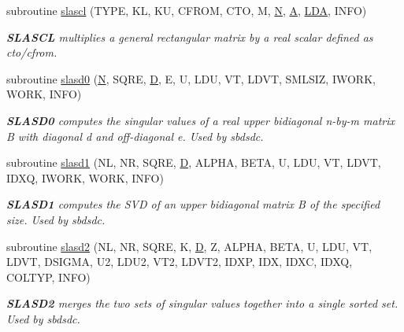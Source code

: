 \begin{DoxyCompactItemize}
subroutine \hyperlink{group__auxOTHERauxiliary_ga11e6ce67ce97ca5b0a3a7bc5645a09d9}{slascl} (T\+Y\+P\+E, K\+L, K\+U, C\+F\+R\+O\+M, C\+T\+O, M, \hyperlink{polmisc_8c_a0240ac851181b84ac374872dc5434ee4}{N}, \hyperlink{classA}{A}, \hyperlink{example__user_8c_ae946da542ce0db94dced19b2ecefd1aa}{L\+D\+A}, I\+N\+F\+O)
\begin{DoxyCompactList}\small\item\em {\bfseries S\+L\+A\+S\+C\+L} multiplies a general rectangular matrix by a real scalar defined as cto/cfrom. \end{DoxyCompactList}\item 
subroutine \hyperlink{group__auxOTHERauxiliary_ga7a8da896f51f0ce43896b61efa3d0381}{slasd0} (\hyperlink{polmisc_8c_a0240ac851181b84ac374872dc5434ee4}{N}, S\+Q\+R\+E, \hyperlink{odrpack_8h_a7dae6ea403d00f3687f24a874e67d139}{D}, E, U, L\+D\+U, V\+T, L\+D\+V\+T, S\+M\+L\+S\+I\+Z, I\+W\+O\+R\+K, W\+O\+R\+K, I\+N\+F\+O)
\begin{DoxyCompactList}\small\item\em {\bfseries S\+L\+A\+S\+D0} computes the singular values of a real upper bidiagonal n-\/by-\/m matrix B with diagonal d and off-\/diagonal e. Used by sbdsdc. \end{DoxyCompactList}\item 
subroutine \hyperlink{group__auxOTHERauxiliary_ga882db55a5643e6b13ebbf68635f3946c}{slasd1} (N\+L, N\+R, S\+Q\+R\+E, \hyperlink{odrpack_8h_a7dae6ea403d00f3687f24a874e67d139}{D}, A\+L\+P\+H\+A, B\+E\+T\+A, U, L\+D\+U, V\+T, L\+D\+V\+T, I\+D\+X\+Q, I\+W\+O\+R\+K, W\+O\+R\+K, I\+N\+F\+O)
\begin{DoxyCompactList}\small\item\em {\bfseries S\+L\+A\+S\+D1} computes the S\+V\+D of an upper bidiagonal matrix B of the specified size. Used by sbdsdc. \end{DoxyCompactList}\item 
subroutine \hyperlink{group__auxOTHERauxiliary_ga33ea099005fc608ad8a5b79662e02b84}{slasd2} (N\+L, N\+R, S\+Q\+R\+E, K, \hyperlink{odrpack_8h_a7dae6ea403d00f3687f24a874e67d139}{D}, Z, A\+L\+P\+H\+A, B\+E\+T\+A, U, L\+D\+U, V\+T, L\+D\+V\+T, D\+S\+I\+G\+M\+A, U2, L\+D\+U2, V\+T2, L\+D\+V\+T2, I\+D\+X\+P, I\+D\+X, I\+D\+X\+C, I\+D\+X\+Q, C\+O\+L\+T\+Y\+P, I\+N\+F\+O)
\begin{DoxyCompactList}\small\item\em {\bfseries S\+L\+A\+S\+D2} merges the two sets of singular values together into a single sorted set. Used by sbdsdc. \end{DoxyCompactList}\item 

\end{DoxyCompactItemize}
